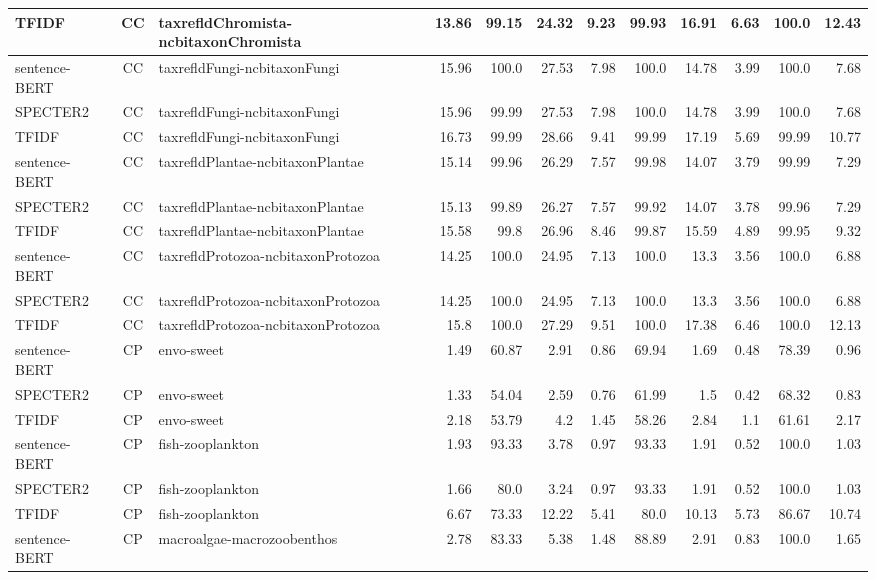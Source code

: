 \begin{table}[h]
\begin{tabular}{|l|c|l|r|r|r|r|r|r|r|r|r|}
	TFIDF  & CC & taxrefldChromista-ncbitaxonChromista  & 13.86 & 99.15 & 24.32 & 9.23 & 99.93 & 16.91 & 6.63 & 100.0 & 12.43\\
	\hline
	sentence-BERT  & CC & taxrefldFungi-ncbitaxonFungi  & 15.96 & 100.0 & 27.53 & 7.98 & 100.0 & 14.78 & 3.99 & 100.0 & 7.68\\
	SPECTER2  & CC & taxrefldFungi-ncbitaxonFungi  & 15.96 & 99.99 & 27.53 & 7.98 & 100.0 & 14.78 & 3.99 & 100.0 & 7.68\\
	TFIDF  & CC & taxrefldFungi-ncbitaxonFungi  & 16.73 & 99.99 & 28.66 & 9.41 & 99.99 & 17.19 & 5.69 & 99.99 & 10.77\\
	\hline
	sentence-BERT  & CC & taxrefldPlantae-ncbitaxonPlantae  & 15.14 & 99.96 & 26.29 & 7.57 & 99.98 & 14.07 & 3.79 & 99.99 & 7.29\\
	SPECTER2  & CC & taxrefldPlantae-ncbitaxonPlantae  & 15.13 & 99.89 & 26.27 & 7.57 & 99.92 & 14.07 & 3.78 & 99.96 & 7.29\\
	TFIDF  & CC & taxrefldPlantae-ncbitaxonPlantae  & 15.58 & 99.8 & 26.96 & 8.46 & 99.87 & 15.59 & 4.89 & 99.95 & 9.32\\
	\hline
	sentence-BERT  & CC & taxrefldProtozoa-ncbitaxonProtozoa  & 14.25 & 100.0 & 24.95 & 7.13 & 100.0 & 13.3 & 3.56 & 100.0 & 6.88\\
	SPECTER2  & CC & taxrefldProtozoa-ncbitaxonProtozoa  & 14.25 & 100.0 & 24.95 & 7.13 & 100.0 & 13.3 & 3.56 & 100.0 & 6.88\\
	TFIDF  & CC & taxrefldProtozoa-ncbitaxonProtozoa  & 15.8 & 100.0 & 27.29 & 9.51 & 100.0 & 17.38 & 6.46 & 100.0 & 12.13\\
	\hline
	sentence-BERT  & CP & envo-sweet  & 1.49 & 60.87 & 2.91 & 0.86 & 69.94 & 1.69 & 0.48 & 78.39 & 0.96\\
	SPECTER2  & CP & envo-sweet  & 1.33 & 54.04 & 2.59 & 0.76 & 61.99 & 1.5 & 0.42 & 68.32 & 0.83\\
	TFIDF  & CP & envo-sweet  & 2.18 & 53.79 & 4.2 & 1.45 & 58.26 & 2.84 & 1.1 & 61.61 & 2.17\\
	\hline
	sentence-BERT  & CP & fish-zooplankton  & 1.93 & 93.33 & 3.78 & 0.97 & 93.33 & 1.91 & 0.52 & 100.0 & 1.03\\
	SPECTER2  & CP & fish-zooplankton  & 1.66 & 80.0 & 3.24 & 0.97 & 93.33 & 1.91 & 0.52 & 100.0 & 1.03\\
	TFIDF  & CP & fish-zooplankton  & 6.67 & 73.33 & 12.22 & 5.41 & 80.0 & 10.13 & 5.73 & 86.67 & 10.74\\
	\hline
	sentence-BERT  & CP & macroalgae-macrozoobenthos  & 2.78 & 83.33 & 5.38 & 1.48 & 88.89 & 2.91 & 0.83 & 100.0 & 1.65\\

\end{tabular}
\end{table}
